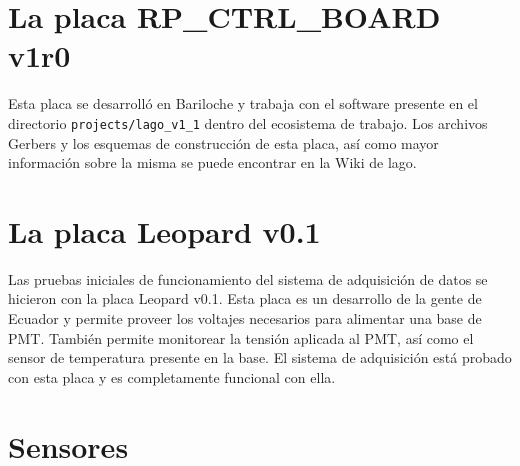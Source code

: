 \documentclass[a4paper,11pt]{article}
\begin{document}
\section{La placa RP\_CTRL\_BOARD v1r0}
Esta placa se desarrolló en Bariloche y trabaja con el software presente en el
directorio \texttt{projects/lago\_v1\_1} dentro del ecosistema de trabajo. Los
archivos Gerbers y los esquemas de construcción de esta placa, así como mayor
información sobre la misma se puede encontrar en la Wiki de lago.


\section{La placa Leopard v0.1}

Las pruebas iniciales de funcionamiento del sistema de adquisición de datos se
hicieron con la placa Leopard v0.1. Esta placa es un desarrollo de la gente de
Ecuador y permite proveer los voltajes necesarios para alimentar una base de
PMT. También permite monitorear la tensión aplicada al PMT, así como el sensor
de temperatura presente en la base. El sistema de adquisición está probado con
esta placa y es completamente funcional con ella.

%

\section{Sensores}
\end{document}
